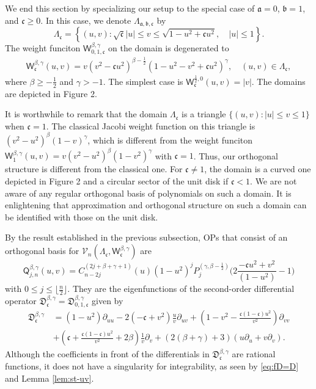 \documentclass{amsart}
\theoremstyle{remark}
\def\sQ{{\mathsf Q}}
\def\sW{{\mathsf W}}
\def\fa{{\mathfrak a}}
\def\fb{{\mathfrak b}}
\def\fc{{\mathfrak c}}
\def\fD{{\mathfrak D}}
\def\b{{\beta}}
\def\g{{\gamma}}
\def\CV{{\mathcal V}}
\def\f{\frac}
\begin{document}
We end this section by specializing our setup to the special case of $\fa = 0$, $\fb = 1$, and $\fc \ge 0$. 
In this case, we  denote $\Lambda_{\fa,\fb,\fc}$ by 
$$
  \Lambda_{\fc} = \left \{(u,v): \sqrt{\fc} |u| \le v \le \sqrt{1-u^2 + \fc u^2}, \quad  |u| \le 1\right \}. 
$$
The weight funciton $\sW_{0, 1,\fc}^{\b,\g}$ on the domain is degenerated to 
\begin{align} \label{eq:sWc}
  \sW_{\fc}^{\b,\g}(u,v)  = v (v^2-\fc u^2)^{\b-\f12} \left(1-u^2-v^2+ \fc u^2 \right)^{\g}, \quad (u,v) \in \Lambda_\fc,
\end{align}
where $\b\ge -\f12$ and $\g > -1$. The simplest case is $\sW_\fc^{\f12,0} (u,v) = |v|$. The domains are depicted in Figure 2. 

It is worthwhile to remark that the domain $\Lambda_{\fc}$ is a triangle $\{(u,v): |u|\le v \le 1\}$ when $\fc = 1$. The 
classical Jacobi weight function on this triangle is $(v^2-u^2)^\b (1-v)^\g$, which is different from the
weight funciton $\sW_1^{\b,\g}(u,v) = v(v^2-u^2)^\b(1-v^2)^\g$ with $\fc =1$. Thus, our orthogonal structure is 
different from the classical one. For $\fc \ne 1$, the domain is a curved one depicted in Figure 2 and a 
circular sector of the unit disk if $\fc < 1$. We are not aware of any regular orthogonal basis of polynomials on
such a domain. It is enlightening that approximation and orthogonal structure on such a domain can be 
identified with those on the unit disk. 

By the result established in the previous subsection, OPs that consist of an orthogonal basis for 
$\CV_n(\Lambda_\fc, \sW_\fc^{\b,\g})$ are 
\begin{equation} \label{eq:sQ_OP}
   \sQ_{j,n}^{\b,\g}(u,v) =  C_{n-2j}^{(2 j + \b+\g+1)}(u) (1-u^2)^{j} P_j^{(\g, \b-\f12)}\bigg(2 \frac{-\fc u^2+v^2}{(1-u^2)} -1\bigg)
\end{equation}
with $0 \le j \le \lfloor \f n 2 \rfloor$. They are the eigenfunctions of the second-order differential operator
 $\fD_\fc^{\b,\g} = \fD_{0,1,\fc}^{\b,\g}$ given by 
\begin{align*}
 \fD_{\fc}^{\b,\g} \, & = (1-u^2) \partial_{uu} - 2(-\fc+v^2) \frac{u}{v} \partial_{u v} + \left(1 - v^2
       - \frac{ \fc (1-\fc) u^2}{v^2}\right)\partial_{vv}\\
  & + \left( \fc + \frac{ \fc (1-\fc) u^2}{v^2} +2\b \right) \frac{1}{v}\partial_{v} 
    + (2(\b + \g)+3) \left( u \partial_u + v\partial_{v}\right).
\end{align*}
Although the coefficients in front of the differentials in $\fD_{\fc}^{\b,\g}$ are rational functions, it does not
have a singularity for integrability, as seen by \eqref{eq:fD=D} and Lemma \ref{lem:st-uv}.
\end{document}
